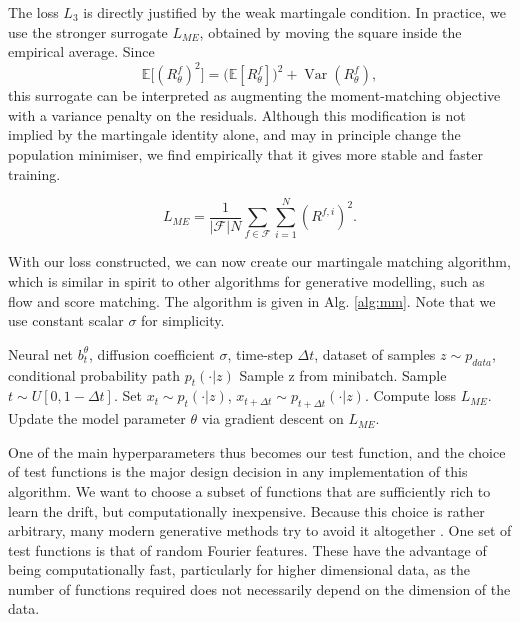 \documentclass[12pt]{article}
\theoremstyle{break}
\begin{document}
The loss $L_3$ is directly justified by the weak martingale
condition. In practice, we use the stronger surrogate $L_{ME}$, obtained by
moving the square inside the empirical average. Since
\[
    \mathbb{E}\bigl[(R_\theta^f)^2\bigr]
    =
    \bigl(\mathbb{E}[R_\theta^f]\bigr)^2
    +
    \operatorname{Var}(R_\theta^f),
\]
this surrogate can be interpreted as augmenting the moment-matching objective
with a variance penalty on the residuals. Although this modification is not
implied by the martingale identity alone, and may in principle change the
population minimiser, we find empirically that it gives more stable and faster
training.

\begin{equation}
	\label{best_loss}
	L_{ME} = \frac{1}{|\mathcal{F}|N} \sum_{f \in \mathcal{F}} \sum_{i=1}^{N} (R^{f, i})^2.
\end{equation}

With our loss constructed, we can now create our martingale matching algorithm, which is similar in spirit to other algorithms for generative modelling, such as flow and score matching. The algorithm is given in Alg. \ref{alg:mm}. Note that we use constant scalar $\sigma$ for simplicity.

\begin{algorithm}
	\caption{Martingale Matching}\label{alg:mm}
	\begin{algorithmic}
		\Require Neural net $b_t^{\theta}$, diffusion coefficient $\sigma$, time-step $\Delta t$, dataset of samples $z \sim p_{data}$, conditional probability path $p_t(\cdot|z)$
		\State Sample z from minibatch.
		\State Sample $t \sim U[0,1-\Delta t]$.
		\State Set $x_t \sim p_t(\cdot|z)$, $x_{t+\Delta t} \sim p_{t + \Delta t}(\cdot|z)$.
		\State Compute loss $L_{ME}$.
		\State Update the model parameter $\theta$ via gradient descent on $L_{ME}$.
		\EndFor	
	\end{algorithmic}
\end{algorithm}


One of the main hyperparameters thus becomes our test function, and the choice of test functions is the major design decision in any implementation of this algorithm. We want to choose a subset of functions that are sufficiently rich to learn the drift, but computationally inexpensive. Because this choice is rather arbitrary, many modern generative methods try to avoid it altogether \cite{holderrieth2025}. 
One set of test functions is that of random Fourier features. These have the advantage of being computationally fast, particularly for higher dimensional data, as the number of functions required does not necessarily depend on the dimension of the data.
\end{document}
